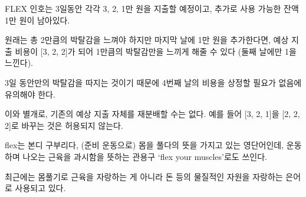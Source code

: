 \begin{problem}{FLEX}
    인호는 3일동안 각각 3, 2, 1만 원을 지출할 예정이고, 추가로 사용 가능한 잔액 1만 원이 남아있다.
    
    원래는 총 2만큼의 박탈감을 느껴야 하지만 마지막 날에 1만 원을 추가한다면, 예상 지출 비용이 [3, 2, 2]가 되어 1만큼의 박탈감만을 느끼게 해줄 수 있다 (둘째 날에만 1을 느낀다).
    
    3일 동안만의 박탈감을 따지는 것이기 때문에 4번째 날의 비용을 상정할 필요가 없음에 유의해야 한다.
    
    이와 별개로, 기존의 예상 지출 자체를 재분배할 수는 없다. 예를 들어 [3, 2, 1]을 [2, 2, 2]로 바꾸는 것은 허용되지 않는다.
    
    \Notes
    flex는 본디 구부리다, (준비 운동으로) 몸을 풀다의 뜻을 가지고 있는 영단어인데, 운동하며 나오는 근육을 과시함을 뜻하는 관용구 `flex your muscles'로도 쓰인다.
    
    최근에는 몸풀기로 근육을 자랑하는 게 아니라 돈 등의 물질적인 자원을 자랑하는 은어로 사용되고 있다.
    
\end{problem}


